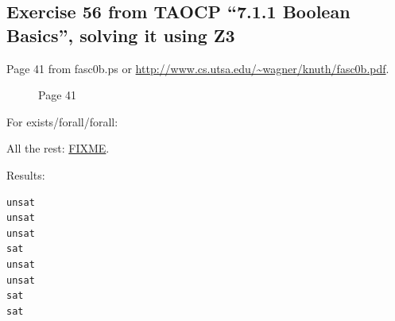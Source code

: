 \subsection{Exercise 56 from TAOCP ``7.1.1 Boolean Basics'', solving it using Z3}

Page 41 from fasc0b.ps or \url{http://www.cs.utsa.edu/~wagner/knuth/fasc0b.pdf}.

\begin{figure}[H]
\centering
{}
\caption{Page 41}
\end{figure}

For exists/forall/forall:



All the rest: \url{FIXME}.

Results:



\begin{lstlisting}
unsat
unsat
unsat
sat
unsat
unsat
sat
sat
\end{lstlisting}


